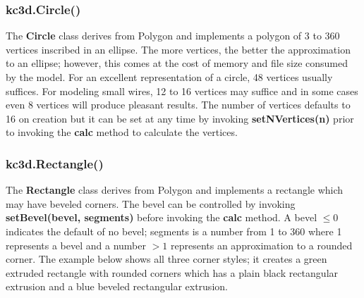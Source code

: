 \subsubsection{kc3d.Circle()}
\label{sec:kc3dCircle}
The \textbf{Circle} class derives from Polygon and implements a polygon of
3 to 360 vertices inscribed in an ellipse.  The more vertices, the better the approximation
to an ellipse; however, this comes at the cost of memory and file size consumed by the
model.  For an excellent representation of a circle, 48 vertices usually suffices. For
modeling small wires, 12 to 16 vertices may suffice and in some cases even 8 vertices
will produce pleasant results. The number of vertices defaults to 16 on creation
but it can be set at any time by invoking \textbf{setNVertices(n)} prior to invoking
the \textbf{calc} method to calculate the vertices.

\subsubsection{kc3d.Rectangle()}
The \textbf{Rectangle} class derives from Polygon and implements a rectangle which
may have beveled corners. The bevel can be controlled by invoking \textbf{setBevel(bevel, segments)}
before invoking the \textbf{calc} method. A bevel $\le0$ indicates the default of no bevel; segments
is a number from 1 to 360 where 1 represents a bevel and a number $>1$ represents an approximation to
a rounded corner.  The example below shows all three corner styles; it creates a green extruded
rectangle with rounded corners which has a plain black rectangular extrusion and a blue
beveled rectangular extrusion.


